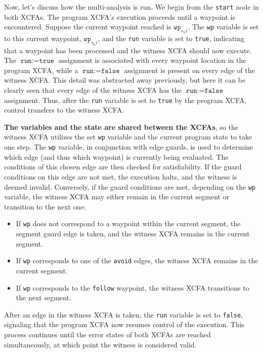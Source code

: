 Now, let's discuss how the multi-analysis is run. We begin from the \texttt{start} node in both XCFAs. 
The program XCFA's execution proceeds until a waypoint is encountered. Suppose the current waypoint 
reached is $\texttt{wp}_{s_ni}$.
The \texttt{wp} variable is set to this current waypoint, $\texttt{wp}_{s_ni}$, and the \texttt{run}
variable is set to \texttt{true}, indicating that a waypoint has been processed and the witness XCFA 
should now execute. The $\texttt{run} := \texttt{true}$ assignment is associated with every waypoint
location in the program XCFA, while a $\texttt{run} := \texttt{false}$ assignment is present on every
edge of the witness XCFA. This detail was abstracted away previously, but here it can be clearly seen 
that every edge of the witness XCFA has the $\texttt{run} := \texttt{false}$ assignment.
Thus, after the \texttt{run} variable is set to \texttt{true} by the program XCFA, control transfers to the witness XCFA.



\textbf{The variables and the state are shared between the XCFAs}, so the witness XCFA utilizes the set
\texttt{wp} variable and the current program state to take one step.
The \texttt{wp} variable, in conjunction with edge guards, is used to determine which edge (and thus 
which waypoint) is currently being evaluated. The conditions of this chosen edge are then checked for satisfiability.
If the guard conditions on this edge are not met, the execution halts, and the witness is deemed invalid. 
Conversely, if the guard conditions are met, depending on the \texttt{wp} variable, the witness XCFA may 
either remain in the current segment or transition to the next one:
\begin{itemize}
    \item If \texttt{wp} does not correspond to a waypoint within the current segment, the segment 
      guard edge is taken, and the witness XCFA remains in the current segment.
    \item If \texttt{wp} corresponds to one of the \texttt{avoid} edges, the witness XCFA remains 
      in the current segment.
    \item If \texttt{wp} corresponds to the \texttt{follow} waypoint, the witness XCFA transitions 
      to the next segment.
\end{itemize}
After an edge in the witness XCFA is taken, the \texttt{run} variable is set to \texttt{false}, 
signaling that the program XCFA now resumes control of the execution.
This process continues until the error states of both XCFAs are reached simultaneously, at which point 
the witness is considered valid.


